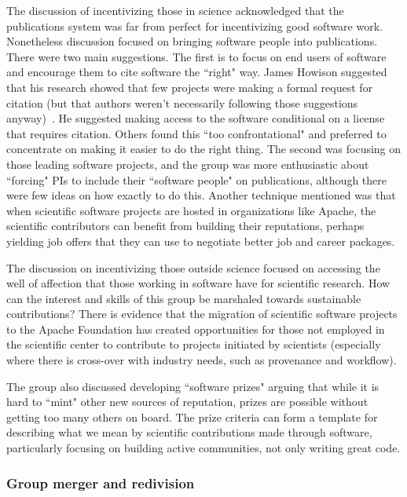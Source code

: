 \documentclass[11pt, oneside]{amsart}
\begin{document}
The discussion of incentivizing those in science acknowledged that the
publications system was far from perfect for incentivizing good software work.
Nonetheless discussion focused on bringing software people into publications.
There were two main suggestions. The first is to focus on end users of software
and encourage them to cite software the ``right" way. James Howison suggested
that his research showed that few projects were making a formal request for
citation (but that authors weren't necessarily following those suggestions
anyway)~\cite{howison2015jasist}. He suggested making access to the software
conditional on a license that requires citation. Others found this ``too
confrontational" and preferred to concentrate on making it easier to do the
right thing. The second was focusing on those leading software projects, and the
group was more enthusiastic about ``forcing" PIs to include their ``software
people" on publications, although there were few ideas on how exactly to do
this. Another technique mentioned was that when scientific software projects are
hosted in organizations like Apache, the scientific contributors can benefit
from building their reputations, perhaps yielding job offers that they can use
to negotiate better job and career packages.

The discussion on incentivizing those outside science focused on accessing the
well of affection that those working in software have for scientific research.
How can the interest and skills of this group be marshaled towards sustainable
contributions? There is evidence that the migration of scientific software
projects to the Apache Foundation has created opportunities for those not
employed in the scientific center to contribute to projects initiated by
scientists (especially where there is cross-over with industry needs, such as
provenance and workflow).

The group also discussed developing ``software prizes" arguing that while it is
hard to ``mint" other new sources of reputation, prizes are possible without
getting too many others on board. The prize criteria can form a template for
describing what we mean by scientific contributions made through software,
particularly focusing on building active communities, not only writing great
code.

\subsubsection{Group merger and redivision}
\end{document}
